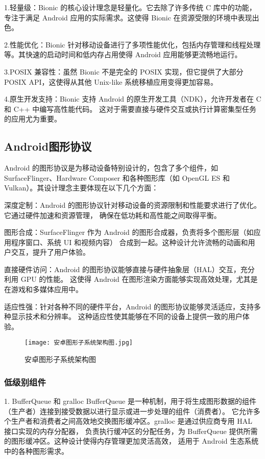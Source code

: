 1.轻量级：Bionic 的核心设计理念是轻量化。它去除了许多传统 C 库中的功能，专注于满足 Android 应用的实际需求。这使得 Bionic 
在资源受限的环境中表现出色。

2.性能优化：Bionic 针对移动设备进行了多项性能优化，包括内存管理和线程处理等。其快速的启动时间和低内存占用使得 
Android 应用能够更流畅地运行。

3.POSIX 兼容性：虽然 Bionic 不是完全的 POSIX 实现，但它提供了大部分 POSIX API，这使得从其他 Unix-like 
系统移植应用变得更加容易。

4.原生开发支持：Bionic 支持 Android 的原生开发工具（NDK），允许开发者在 C 和 C++ 中编写高性能代码。
这对于需要直接与硬件交互或执行计算密集型任务的应用尤为重要。

\subsection{Android图形协议}
Android 的图形协议是为移动设备特别设计的，包含了多个组件，如 SurfaceFlinger、Hardware Composer 
和各种图形库（如 OpenGL ES 和 Vulkan）。其设计理念主要体现在以下几个方面：

深度定制：Android 的图形协议针对移动设备的资源限制和性能要求进行了优化。它通过硬件加速和资源管理，
确保在低功耗和高性能之间取得平衡。

图形合成：SurfaceFlinger 作为 Android 的图形合成器，负责将多个图形层（如应用程序窗口、系统 UI 和视频内容）
合成到一起。这种设计允许流畅的动画和用户交互，提升了用户体验。

直接硬件访问：Android 的图形协议能够直接与硬件抽象层（HAL）交互，充分利用 GPU 的性能。
这使得 Android 在图形渲染方面能够实现高效处理，尤其是在游戏和多媒体应用中。

适应性强：针对各种不同的硬件平台，Android 的图形协议能够灵活适应，支持多种显示技术和分辨率。
这种适应性使其能够在不同的设备上提供一致的用户体验。

\begin{figure}[h]
  \centering
  \texttt{[image: 安卓图形子系统架构图.jpg]}
  \caption{安卓图形子系统架构图}
\end{figure}

\subsubsection{低级别组件}

1. BufferQueue 和 gralloc
BufferQueue 是一种机制，用于将生成图形数据的组件（生产者）连接到接受数据以进行显示或进一步处理的组件（消费者）。
它允许多个生产者和消费者之间高效地交换图形缓冲区。gralloc 是通过供应商专用 HAL 接口实现的内存分配器，
负责执行缓冲区的分配任务，为 BufferQueue 提供所需的图形缓冲区。这种设计使得内存管理更加灵活高效，
适用于 Android 生态系统中的各种图形需求。


